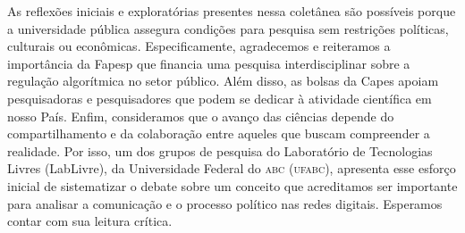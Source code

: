 As reflexões iniciais e exploratórias presentes nessa coletânea são
possíveis porque a universidade pública assegura condições para pesquisa
sem restrições políticas, culturais ou econômicas. Especificamente,
agradecemos e reiteramos a importância da Fapesp que financia uma
pesquisa interdisciplinar sobre a regulação algorítmica no setor
público. Além disso, as bolsas da Capes apoiam pesquisadoras e
pesquisadores que podem se dedicar à atividade científica em nosso País.
Enfim, consideramos que o avanço das ciências depende do
compartilhamento e da colaboração entre aqueles que buscam
compreender a realidade. Por isso, um dos grupos de pesquisa do
Laboratório de Tecnologias Livres (LabLivre), da Universidade Federal do \textsc{abc}
(\textsc{ufabc}), apresenta esse esforço inicial de sistematizar o debate sobre um
conceito que acreditamos ser importante para analisar a comunicação e o
processo político nas redes digitais. Esperamos contar com sua leitura
crítica.